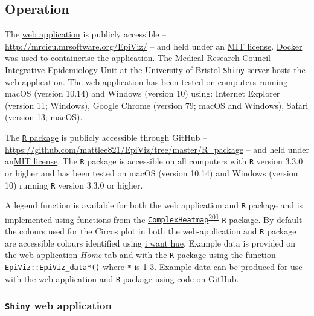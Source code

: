 \documentclass[11pt,twoside]{bristolthesis}
\begin{document}
\hypertarget{operation}{%
\subsection{Operation}\label{operation}}

The \href{http://mrcieu.mrsoftware.org/EpiViz/}{web application} is publicly accessible -- \url{http://mrcieu.mrsoftware.org/EpiViz/} -- and held under an \href{https://github.com/mattlee821/EpiViz/blob/master/LICENSE.txt}{MIT license}. \href{https://www.docker.com/}{Docker} was used to containerise the application. The \href{http://mrcieu.mrsoftware.org/EpiViz/}{Medical Research Council Integrative Epidemiology Unit} at the University of Bristol \texttt{Shiny} server hosts the web application. The web application has been tested on computers running macOS (version 10.14) and Windows (version 10) using: Internet Explorer (version 11; Windows), Google Chrome (version 79; macOS and Windows), Safari (version 13; macOS).

The \href{https://github.com/mattlee821/EpiViz/tree/master/R_package}{\texttt{R} package} is publicly accessible through GitHub -- \url{https://github.com/mattlee821/EpiViz/tree/master/R_package} -- and held under an\href{https://github.com/mattlee821/EpiViz/blob/master/LICENSE.txt}{MIT license}. The \texttt{R} package is accessible on all computers with \texttt{R} version 3.3.0 or higher and has been tested on macOS (version 10.14) and Windows (version 10) running \texttt{R} version 3.3.0 or higher.

A legend function is available for both the web application and \texttt{R} package and is implemented using functions from the \href{https://jokergoo.github.io/ComplexHeatmap-reference/book/}{\texttt{ComplexHeatmap}}\textsuperscript{\protect\hyperlink{ref-Gu2016}{201}} \texttt{R} package. By default the colours used for the Circos plot in both the web-application and \texttt{R} package are accessible colours identified using \href{https://medialab.github.io/iwanthue/}{i want hue}. Example data is provided on the web application \emph{Home} tab and with the \texttt{R} package using the function \texttt{EpiViz::EpiViz\_data*()} where \texttt{*} is 1-3. Example data can be produced for use with the web-application and \texttt{R} package using code on \href{https://github.com/mattlee821/EpiViz/blob/master/R_package/data-raw/example_data_simulation.R}{GitHub}.

\hypertarget{shiny-web-application}{%
\subsubsection{\texorpdfstring{\texttt{Shiny} web application}{Shiny web application}}\label{shiny-web-application}}
\end{document}
